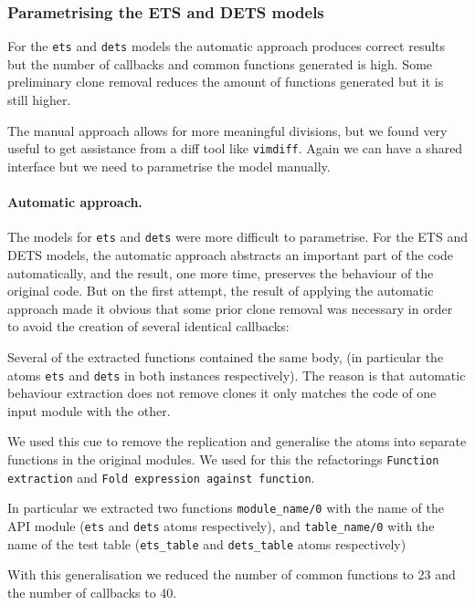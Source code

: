 \subsubsection{Parametrising the ETS and DETS models}

For the \texttt{ets} and \texttt{dets} models the automatic approach produces 
correct 
results but the number of callbacks and common functions generated is 
high. Some preliminary clone removal reduces the amount of functions 
generated but it is still higher.


The manual approach allows for more meaningful divisions, but we found 
very useful to get assistance from a diff tool like \texttt{vimdiff}. Again we 
can have a shared interface but we need to parametrise the model 
manually.

\paragraph{Automatic approach.}

The models for \texttt{ets} and \texttt{dets} were more difficult to 
parametrise. For the ETS and DETS models, the automatic approach abstracts an 
important part of the code automatically, and the result, one more time, 
preserves the behaviour of the original code. But on the first attempt, the 
result of applying the automatic approach made it obvious that some prior clone 
removal was necessary in order to avoid the creation of several identical 
callbacks:

Several of the extracted functions contained the same body, (in particular the 
atoms \texttt{ets} and \texttt{dets} in both instances respectively). The 
reason 
is that automatic behaviour extraction does not remove clones it only matches 
the code of one input module with the other.

We used this cue to remove the replication and generalise the atoms into 
separate functions in the original modules. We used for this the refactorings 
\texttt{Function extraction} and \texttt{Fold expression against function}.

In particular we extracted two functions \texttt{module\_name/0} with 
the name of the API module (\texttt{ets} and \texttt{dets} atoms respectively), 
and \texttt{table\_name/0} with the name of the test table (\texttt{ets\_table} 
and \texttt{dets\_table} atoms respectively)

With this generalisation we reduced the number of common functions to 23 and 
the number of callbacks to 40.

